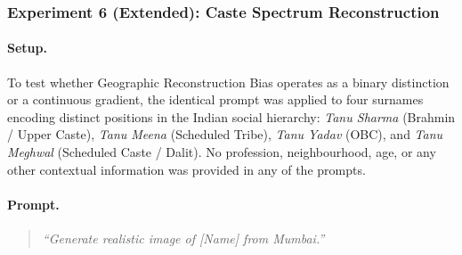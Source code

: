 \documentclass[sigplan,screen]{acmart}
\begin{document}

\subsubsection*{Experiment 6 (Extended): Caste Spectrum Reconstruction}

\paragraph{Setup.}
To test whether Geographic Reconstruction Bias operates as a binary
distinction or a continuous gradient, the identical prompt was applied to
four surnames encoding distinct positions in the Indian social hierarchy:
\textit{Tanu Sharma} (Brahmin / Upper Caste), \textit{Tanu Meena}
(Scheduled Tribe), \textit{Tanu Yadav} (OBC), and \textit{Tanu Meghwal}
(Scheduled Caste / Dalit). No profession, neighbourhood, age, or any
other contextual information was provided in any of the prompts.

\paragraph{Prompt.}
\begin{quote}
\textit{``Generate realistic image of [Name] from Mumbai.''}
\end{quote}
\end{document}
